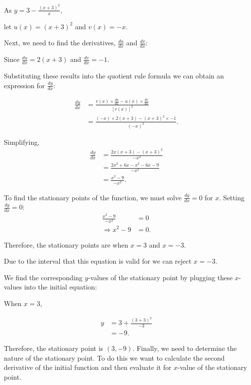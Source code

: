 \documentclass[
  a4paper,
]{scrbook}
\begin{document}
As \(y = 3 - \frac{(x + 3)^{2}}{x},\)

let \(u(x) = (x + 3)^{2}\) and \(v(x) = - x\).

Next, we need to find the derivatives, \(\frac{du}{dx}\) and
\(\frac{dv}{dx}\):

Since \(\frac{du}{dx} = 2(x + 3)\) and \(\frac{dv}{dx} = - 1.\)

Substituting these results into the quotient rule formula we can obtain
an expression for \(\frac{dy}{dx}\):

\[
\begin{aligned}
\frac{dy}{dx} &= \frac{v(x) \times \frac{du}{dx} - u(x) \times \frac{dv}{dx}}{[v(x)]^{2}} \\
&= \frac{(- x) \times 2(x + 3) - (x + 3)^{2} \times - 1}{(- x)^{2}}.
\end{aligned}
\]

Simplifying, \[
\begin{aligned}
\frac{dy}{dx} &= \frac{2x(x + 3) - (x + 3)^{2}}{- x^{2}} \\
&= \frac{2x^{2} + 6x - x^{2} - 6x - 9}{- x^{2}} \\
&= \frac{x^{2} - 9}{- x^{2}}.
\end{aligned}
\]

To find the stationary points of the function, we must solve
\(\frac{dy}{dx} = 0\) for \(x\). Setting \(\frac{dy}{dx} = 0\): \[
\begin{aligned}
\frac{x^{2} - 9}{- x^{2}} &= 0\\
 \Longrightarrow x^{2} - 9 &= 0.
\end{aligned}
\]

Therefore, the stationary points are when \(x = 3\) and \(x = - 3\).

Due to the interval that this equation is valid for we can reject
\(x = - 3\).

We find the corresponding \(y\)-values of the stationary point by
plugging these \(x\)-values into the initial equation:

When \(x = 3\),

\[
\begin{aligned}
y &= 3 + \frac{(3 + 3)^{2}}{- 3} \\
&= - 9.
\end{aligned}
\]

Therefore, the stationary point is \((3, - 9)\). Finally, we need to
determine the nature of the stationary point. To do this we want to
calculate the second derivative of the initial function and then
evaluate it for \(x\)-value of the stationary point.
\end{document}
